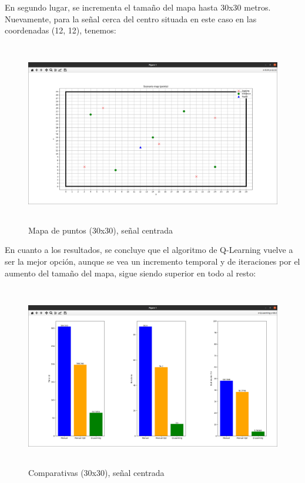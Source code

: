 En segundo lugar, se incrementa el tamaño del mapa hasta 30x30 metros.\\

Nuevamente, para la señal cerca del centro situada en este caso en las coordenadas (12, 12), tenemos:

\begin{figure} [H]
    \begin{center}
    \includegraphics[height=8cm]{imagenes/cap4/21_mapa_p_centro_30.png}
    \end{center}
    \caption[Mapa de puntos (30x30), señal centrada]{Mapa de puntos (30x30), señal centrada}
    \label{fig:map_p_center_30}
\end{figure}

En cuanto a los resultados, se concluye que el algoritmo de Q-Learning vuelve a ser la mejor opción, aunque se vea un incremento temporal y de iteraciones por el aumento del tamaño del mapa, sigue siendo superior en todo al resto:\\

\begin{figure} [H]
    \begin{center}
    \includegraphics[height=8cm]{imagenes/cap4/22_comp_centro_30.png}
    \end{center}
    \caption[Comparativas (30x30), señal centrada]{Comparativas (30x30), señal centrada}
    \label{fig:comp_center_30}
\end{figure}

